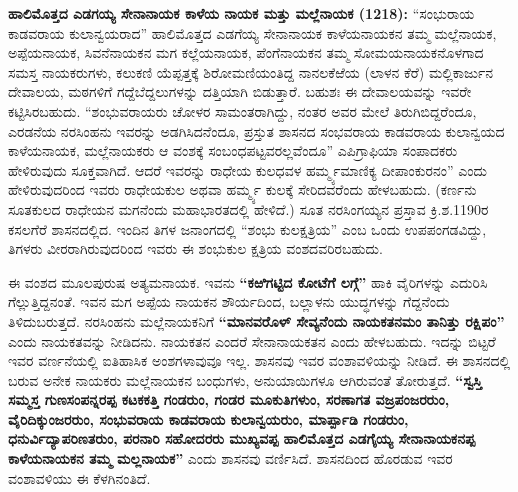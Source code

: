 \textbf{ಹಾಲಿಮೊತ್ತದ ಎಡಗಯ್ಯ ಸೇನಾನಾಯಕ ಕಾಳೆಯ ನಾಯಕ ಮತ್ತು ಮಲ್ಲೆನಾಯಕ (1218):} “ಸಂಭುರಾಯ ಕಾಡವರಾಯ ಕುಲಾನ್ವಯರಾದ” ಹಾಲಿಮೊತ್ತದ ಎಡಗೆಯ್ಯ ಸೇನಾನಾಯಕ ಕಾಳೆಯನಾಯಕನ ತಮ್ಮ ಮಲ್ಲೆನಾಯಕ, ಅಪ್ಪೆಯನಾಯಕ, ಸಿವನೆನಾಯಕನ ಮಗ ಕಲ್ಲೆಯನಾಯಕ, ಪೆಂಗೆನಾಯಕನ ತಮ್ಮ ಸೋಮಯನಾಯಕನೊಳಗಾದ ಸಮಸ್ತ ನಾಯಕರುಗಳು, ಕಲುಕಣಿ ಯೆಪ್ಪತ್ತಕ್ಕೆ ಶಿರೋಮಣಿಯಂತಿದ್ದ ನಾನಲಕೆಱೆಯ (ಲಾಳನ ಕೆರೆ) ಮಲ್ಲಿಕಾರ್ಜುನ ದೇವಾಲಯ, ಮಠಗಳಿಗೆ ಗದ್ದೆಬೆದ್ದಲುಗಳನ್ನು ದತ್ತಿಯಾಗಿ ಬಿಡುತ್ತಾರೆ. ಬಹುಶಃ ಈ ದೇವಾಲಯವನ್ನು ಇವರೇ ಕಟ್ಟಿಸಿರಬಹುದು. “ಶಂಭುವರಾಯರು ಚೋಳರ ಸಾಮಂತರಾಗಿದ್ದು, ನಂತರ ಅವರ ಮೇಲೆ ತಿರುಗಿಬಿದ್ದರೆಂದೂ, ಎರಡನೆಯ ನರಸಿಂಹನು ಇವರನ್ನು ಅಡಗಿಸಿದನೆಂದೂ, ಪ್ರಸ್ತುತ ಶಾಸನದ ಸಂಭವರಾಯ ಕಾಡವರಾಯ ಕುಲಾನ್ವಯದ ಕಾಳೆಯನಾಯಕ, ಮಲ್ಲೆ\-ನಾಯಕರು ಆ ವಂಶಕ್ಕೆ ಸಂಬಂಧಪಟ್ಟವ\-ರಲ್ಲವೆಂದೂ” ಎಪಿಗ್ರಾಫಿಯಾ ಸಂಪಾದಕರು ಹೇಳಿರುವುದು ಸೂಕ್ತವಾಗಿದೆ. ಆದರೆ ಇವರನ್ನು ರಾಧೇಯ ಕುಲಧವಳ ಹರ್ಮ್ಮ್ಯಮಾಣಿಕ್ಯ ದೀಪಾಂಕುರನಂ” ಎಂದು ಹೇಳಿರುವುದರಿಂದ ಇವರು ರಾಧೇಯಕುಲ ಅಥವಾ ಹರ್ಮ್ಮ್ಯ ಕುಲಕ್ಕೆ ಸೇರಿದವ\-ರೆಂದು ಹೇಳಬಹುದು. (ಕರ್ಣನು ಸೂತಕುಲದ ರಾಧೇಯನ ಮಗನೆಂದು ಮಹಾಭಾರತ\-ದಲ್ಲಿ ಹೇಳಿದೆ.) ಸೂತ ನರಸಿಂಗಯ್ಯನ ಪ್ರಸ್ತಾವ ಕ್ರಿ.ಶ.1190ರ ಕಸಲಗೆರೆ ಶಾಸನದಲ್ಲಿದ. ಇಂದಿನ ತಿಗಳ ಜನಾಂಗದಲ್ಲಿ “ಶಂಭು ಕುಲಕ್ಷತ್ರಿಯ” ಎಂಬ ಒಂದು ಉಪಪಂಗಡವಿದ್ದು, ತಿಗಳರು ವೀರರಾಗಿರುವುದರಿಂದ ಇವರು ಈ ಶಂಭುಕುಲ ಕ್ಷತ್ರಿಯ ವಂಶದವರಿರಬಹುದು.

ಈ ವಂಶದ ಮೂಲಪುರುಷ ಅತ್ಯಮನಾಯಕ. ಇವನು \textbf{“ಕಱಿಗಟ್ಟಿದ ಕೋಟೆಗೆ ಲಗ್ಗೆ”} ಹಾಕಿ ವೈರಿಗಳನ್ನು ಎದುರಿಸಿ ಗೆಲ್ಲುತ್ತಿದ್ದನಂತೆ. ಇವನ ಮಗ ಅಪ್ಪೆಯ ನಾಯಕನ ಶೌರ್ಯದಿಂದ, ಬಲ್ಲಾಳನು ಯುದ್ಧಗಳನ್ನು ಗೆದ್ದನೆಂದು ತಿಳಿದುಬರುತ್ತದೆ. ನರಸಿಂಹನು ಮಲ್ಲೆನಾಯಕನಿಗೆ \textbf{“ಮಾನವರೊಳ್​ ಸೇವ್ಯನೆಂದು ನಾಯಕತನಮಂ ತಾನಿತ್ತು ರಕ್ಷಿಪಂ”} ಎಂದು ನಾಯಕತವನ್ನು ನೀಡಿದನು. ನಾಯಕತನ ಎಂದರೆ ಸೇನಾನಾಯಕತನ ಎಂದು ಹೇಳಬಹುದು. ಇದನ್ನು ಬಿಟ್ಟರೆ ಇವರ ವರ್ಣನೆಯಲ್ಲಿ ಐತಿಹಾಸಿಕ ಅಂಶಗಳಾವುವೂ ಇಲ್ಲ. ಶಾಸನವು ಇವರ ವಂಶಾವಳಿಯನ್ನು ನೀಡಿದೆ. ಈ ಶಾಸನದಲ್ಲಿ ಬರುವ ಅನೇಕ ನಾಯಕರು ಮಲ್ಲೆನಾಯಕನ ಬಂಧುಗಳು, ಅನುಯಾಯಿಗಳೂ ಆಗಿರುವಂತೆ ತೋರುತ್ತದೆ. \textbf{“ಸ್ವಸ್ತಿ ಸಮ್ಮಸ್ತ ಗುಣಸಂಪನ್ನರಪ್ಪ ಕಟಕಕತ್ತಿ ಗಂಡರುಂ, ಗಂಡರ ಮೂಕುತಿಗಳುಂ, ಸರಣಾಗತ ವಜ್ರಪಂಜರರುಂ, ವೈರಿದಿಕ್ಕುಂಜರರುಂ, ಸಂಭುವರಾಯ ಕಾಡವರಾಯ ಕುಲಾನ್ವಯರುಂ, ಮಾರ್ಪ್ಪಾಡಿ ಗಂಡರುಂ, ಧನುರ್ವಿದ್ಯಾಪರಿಣತರುಂ, ಪರನಾರಿ ಸಹೋದರರು ಮುಖ್ಯವಪ್ಪ ಹಾಲಿಮೊತ್ತದ ಎಡಗೈಯ್ಯ ಸೇನಾನಾಯಕನಪ್ಪ ಕಾಳೆಯನಾಯಕನ ತಮ್ಮ ಮಲ್ಲನಾಯಕ”} ಎಂದು ಶಾಸನವು ವರ್ಣಿಸಿದೆ. ಶಾಸನದಿಂದ ಹೊರಡುವ ಇವರ ವಂಶಾವಳಿಯು ಈ ಕೆಳಗಿನಂತಿದೆ.

